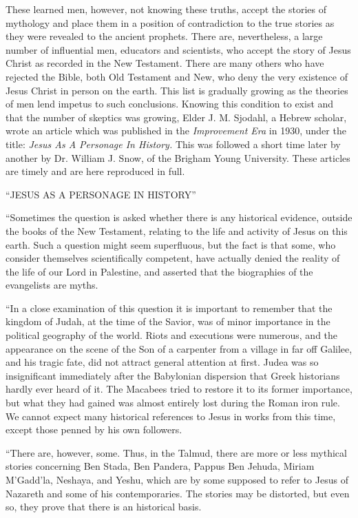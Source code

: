 These learned men, however, not knowing these truths, accept the stories of mythology and
place them in a position of contradiction to the true stories as they were revealed to the
ancient prophets. There are, nevertheless, a large number of influential men, educators and
scientists, who accept the story of Jesus Christ as recorded in the New Testament. There are
many others who have rejected the Bible, both Old Testament and New, who deny the very
existence of Jesus Christ in person on the earth. This list is gradually growing as the theories
of men lend impetus to such conclusions. Knowing this condition to exist and that the
number of skeptics was growing, Elder J. M. Sjodahl, a Hebrew scholar, wrote an article
which was published in the \textit{Improvement Era} in 1930, under the title: \textit{Jesus As A Personage
In History.} This was followed a short time later by another by Dr. William J. Snow, of the
Brigham Young University. These articles are timely and are here reproduced in full.

``JESUS AS A PERSONAGE IN HISTORY''

``Sometimes the question is asked whether there is any historical evidence, outside the books
of the New Testament, relating to the life and activity of Jesus on this earth. Such a question
might seem superfluous, but the fact is that some, who consider themselves scientifically
competent, have actually denied the reality of the life of our Lord in Palestine, and asserted
that the biographies of the evangelists are myths.

``In a close examination of this question it is important to remember that the kingdom of
Judah, at the time of the Savior, was of minor importance in the political geography of the
world. Riots and executions were numerous, and the appearance on the scene of the Son of a
carpenter from a village in far off Galilee, and his tragic fate, did not attract general attention
at first. Judea was so insignificant immediately after the Babylonian dispersion that Greek
historians hardly ever heard of it. The Macabees tried to restore it to its former importance,
but what they had gained was almost entirely lost during the Roman iron rule. We cannot
expect many historical references to Jesus in works from this time, except those penned by
his own followers.

``There are, however, some. Thus, in the Talmud, there are more or less mythical stories
concerning Ben Stada, Ben Pandera, Pappus Ben Jehuda, Miriam M'Gadd'la, Neshaya, and
Yeshu, which are by some supposed to refer to Jesus of Nazareth and some of his
contemporaries. The stories may be distorted, but even so, they prove that there is an
historical basis.

